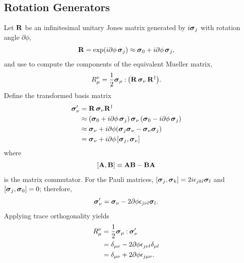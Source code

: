\subsection{Rotation Generators}

Let ${\bf R}$ be an infinitesimal unitary Jones matrix generated by $i\mbox{\boldmath $\sigma$}_{j}$ with 
rotation angle $\partial\phi$, 
\begin{equation} \label{eqn:small_rotation_basis_Jones}
{\bf R} = \exp(i\partial\phi\,\mbox{\boldmath $\sigma$}_{j}) \approx \mbox{\boldmath $\sigma$}_{0} + i \partial\phi \, \mbox{\boldmath $\sigma$}_{j},
\end{equation} 
and use  to compute the components of the equivalent Mueller matrix,
\begin{equation}
  R_\mu^\nu = \frac{1}{2} {\mbox{\boldmath $\sigma$}_{\mu}}\mathbin{:}{\left({\bf R} \, \mbox{\boldmath $\sigma$}_{\nu}\,{\bf R}^\dagger\right)}.
\end{equation}
%
Define the transformed basis matrix
\begin{equation}
\begin{split}
\mbox{\boldmath $\sigma$}_{\nu}' & = {\bf R} \, \mbox{\boldmath $\sigma$}_{\nu} {\bf R} ^\dagger \\
  & \approx \left( \mbox{\boldmath $\sigma$}_{0} + i \partial\phi \, \mbox{\boldmath $\sigma$}_{j} \right) \mbox{\boldmath $\sigma$}_{\nu} \left( \mbox{\boldmath $\sigma$}_{0} - i \partial\phi \, \mbox{\boldmath $\sigma$}_{j} \right) \\
  & \approx \mbox{\boldmath $\sigma$}_{\nu} + i \partial\phi (\mbox{\boldmath $\sigma$}_{j} \mbox{\boldmath $\sigma$}_{\nu} - \mbox{\boldmath $\sigma$}_{\nu} \mbox{\boldmath $\sigma$}_{j}) \\
  & = \mbox{\boldmath $\sigma$}_{\nu} + i \partial\phi \left[\mbox{\boldmath $\sigma$}_{j}, \mbox{\boldmath $\sigma$}_{\nu}\right]
\end{split}
\end{equation}
%
where
\begin{equation} \label{eqn:commutator}
\left[{\bf A}, {\bf B}\right] \equiv {\bf AB} - {\bf BA}
\end{equation}
is the matrix commutator.
%
For the Pauli matrices, $\left[\mbox{\boldmath $\sigma$}_{j}, \mbox{\boldmath $\sigma$}_{k}\right] = 2 i \epsilon_{jkl}\mbox{\boldmath $\sigma$}_{l}$ and $\left[\mbox{\boldmath $\sigma$}_{j}, \mbox{\boldmath $\sigma$}_{0}\right] = 0$; therefore,
\begin{equation}
    \mbox{\boldmath $\sigma$}_{\nu}' = \mbox{\boldmath $\sigma$}_{\nu} - 2 \partial\phi \epsilon_{j \nu l}\mbox{\boldmath $\sigma$}_{l}.
\end{equation}
Applying trace orthogonality yields
%
\begin{equation}
\begin{split}
R_\mu^\nu 
  &= \frac{1}{2} {\mbox{\boldmath $\sigma$}_{\mu}}\mathbin{:}{\mbox{\boldmath $\sigma$}_{\nu}'} \\
  &= \delta_{\mu\nu} - 2 \partial\phi \epsilon_{j \nu l} \delta_{\mu l} \\
  &= \delta_{\mu\nu} + 2 \partial\phi \epsilon_{j \mu \nu } .
\end{split}
\end{equation}
